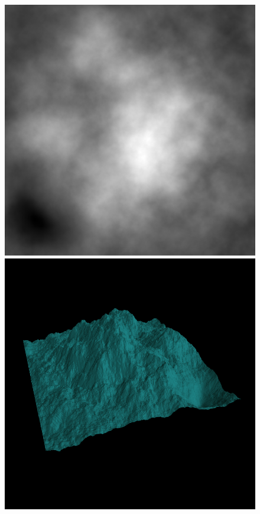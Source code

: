 	\begin{figure}[H]
		\centering
		\includegraphics[width=\imagewidth]{images/results/terrains/512-1/blending/neg_quadratic}
		\includegraphics[width=\imagewidth]{images/results/terrains/512-1/blending/neg_quadratic_3d}

\end{figure}
